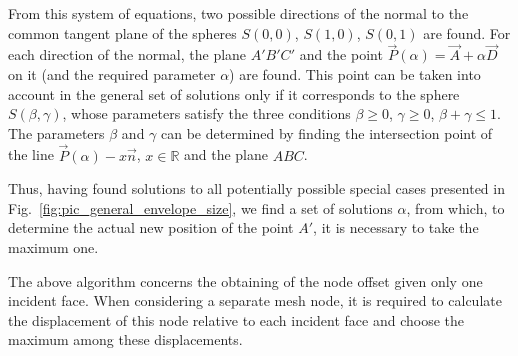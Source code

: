 \documentclass[
11pt,%
tightenlines,%
twoside,%
onecolumn,%
nofloats,%
nobibnotes,%
nofootinbib,%
superscriptaddress,%
noshowpacs,%
centertags]%
{revtex4-2}
\begin{document}
From this system of equations, two possible directions of the normal to the common tangent plane of the spheres $S(0,0)$, $S(1,0)$, $S(0, 1)$ are found.
For each direction of the normal, the plane $A'B'C'$ and the point $\vec{P}(\alpha) = \vec{A} + \alpha \vec{D}$ on it (and the required parameter $\alpha$) are found.
This point can be taken into account in the general set of solutions only if it corresponds to the sphere $S(\beta, \gamma)$, whose parameters satisfy the three conditions $\beta \ge 0$, $\gamma \ge 0$, $ \beta + \gamma \le 1$.
The parameters $\beta$ and $\gamma$ can be determined by finding the intersection point of the line $\vec{P}(\alpha) - x \vec{n}$, $x \in \mathbb{R}$ and the plane $ABC$.

Thus, having found solutions to all potentially possible special cases presented in Fig.~\ref{fig:pic_general_envelope_size}, we find a set of solutions $\alpha$, from which, to determine the actual new position of the point $A'$, it is necessary to take the maximum one.

The above algorithm concerns the obtaining of the node offset given only one incident face.
When considering a separate mesh node, it is required to calculate the displacement of this node relative to each incident face and choose the maximum among these displacements.
\end{document}
